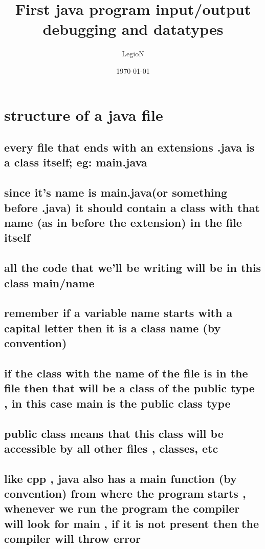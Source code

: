 \documentclass[11pt]{article}
\author{LegioN}
\date{\today}
\title{First java program input/output debugging and datatypes}
\begin{document}
\maketitle
\tableofcontents

\section{structure of a java file}
\label{sec:org66d4a38}
\subsection{every file that ends with an extensions .java is a class itself; eg: main.java}
\label{sec:orga118ea4}
\subsection{since it's name is main.java(or something before .java) it should contain a class with that name (as in before the extension) in the file itself}
\label{sec:orga295852}
\subsection{all the code that we'll be writing will be in this class main/name}
\label{sec:org7f76fb8}
\subsection{remember if a variable name starts with a capital letter then it is a class name (by convention)}
\label{sec:orga9bfeb5}
\subsection{if the class with the name of the file is in the file then that will be a class of the public type , in this case main is the public class type}
\label{sec:org8cc93f3}
\subsection{public class means that this class will be accessible by all other files , classes, etc}
\label{sec:orgb7e107b}
\subsection{like cpp , java also has a main function (by convention) from where the program starts , whenever we run the program the compiler will look for main , if it is not present then the compiler will throw error}
\label{sec:orgadca9b7}
\end{document}
